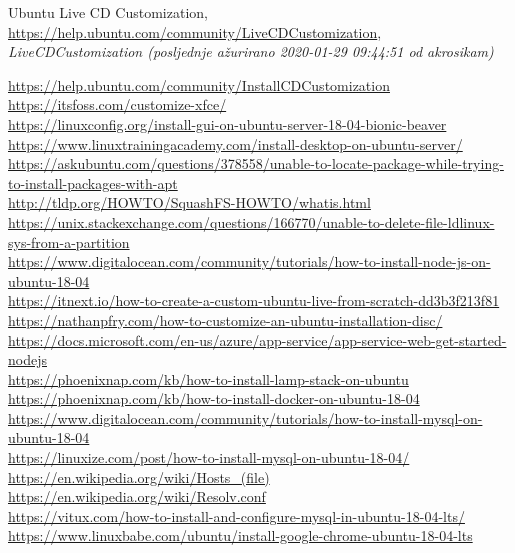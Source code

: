 \documentclass[12pt,vi]{mitthesis}
\begin{document}
\renewcommand*\bibname{Reference}
\begin{thebibliography}{20}
Ubuntu Live CD Customization,
\url{https://help.ubuntu.com/community/LiveCDCustomization},
\textit{LiveCDCustomization (posljednje ažurirano 2020-01-29 09:44:51 od akrosikam)}

\end{thebibliography}
\url{https://help.ubuntu.com/community/InstallCDCustomization}\\
\url{https://itsfoss.com/customize-xfce/}\\
\url{https://linuxconfig.org/install-gui-on-ubuntu-server-18-04-bionic-beaver}\\
\url{https://www.linuxtrainingacademy.com/install-desktop-on-ubuntu-server/}\\
\url{https://askubuntu.com/questions/378558/unable-to-locate-package-while-trying-to-install-packages-with-apt}\\
\url{http://tldp.org/HOWTO/SquashFS-HOWTO/whatis.html}\\
\url{https://unix.stackexchange.com/questions/166770/unable-to-delete-file-ldlinux-sys-from-a-partition}\\
\url{https://www.digitalocean.com/community/tutorials/how-to-install-node-js-on-ubuntu-18-04}\\
\url{https://itnext.io/how-to-create-a-custom-ubuntu-live-from-scratch-dd3b3f213f81}\\
\url{https://nathanpfry.com/how-to-customize-an-ubuntu-installation-disc/}\\
\url{https://docs.microsoft.com/en-us/azure/app-service/app-service-web-get-started-nodejs}\\
\url{https://phoenixnap.com/kb/how-to-install-lamp-stack-on-ubuntu}\\
\url{https://phoenixnap.com/kb/how-to-install-docker-on-ubuntu-18-04}\\
\url{https://www.digitalocean.com/community/tutorials/how-to-install-mysql-on-ubuntu-18-04}\\
\url{https://linuxize.com/post/how-to-install-mysql-on-ubuntu-18-04/}\\
\url{https://en.wikipedia.org/wiki/Hosts_(file)}\\
\url{https://en.wikipedia.org/wiki/Resolv.conf}\\
\url{https://vitux.com/how-to-install-and-configure-mysql-in-ubuntu-18-04-lts/}\\
\url{https://www.linuxbabe.com/ubuntu/install-google-chrome-ubuntu-18-04-lts}\\
\end{document}
